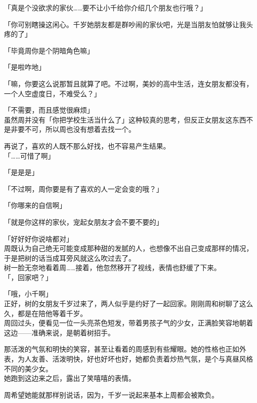「真是个没欲求的家伙……要不让小千给你介绍几个朋友也行哦？」

「你可别瞎操这闲心。千岁她朋友都是群吵闹的家伙吧，光是当朋友怕就够让我头疼的了」

「毕竟周你是个阴暗角色嘛」

「是啦咋地」

「嘛，你要这么说那暂且就算了吧。不过啊，美妙的高中生活，连女朋友都没有，一个人空虚度日，不难受么？」

「不需要，而且感觉很麻烦」\\

虽然周并没有「你把学校生活当什么了」这种较真的思考，但反正女朋友这东西不是非要不可，所以周也没有想着去找一个。

再说了，喜欢的人既不那么好找，也不容易产生结果。\\

「……可惜了啊」

「是是是」

「不过啊，周你要是有了喜欢的人一定会变的哦？」

「你哪来的自信啊」

「就是你这样的家伙，宠起女朋友才会不要不要的」

「好好好你说啥都对」\\

周既认为自己绝无可能变成那种甜的发腻的人，也想像不出自己变成那样的情况，于是把树的话当成耳旁风就这么吹过去了。\\

树一脸无奈地看着周……接着，他忽然移开了视线，表情也舒缓了下来。\\

「，回家吧？」

「哦，小千啊」\\

正好，树的女朋友千岁过来了，两人似乎是约好了一起回家。刚刚周和树聊了这么久，都是在陪他等着千岁。\\

周回过头，便看见一位一头亮茶色短发，带着男孩子气的少女，正满脸笑容地朝着这边——准确来说，是朝着树招手。

那活泼的气氛和明快的笑容，甚至让看着的周感到有些耀眼。她的性格也正如外表，为人友善、活泼明快，好也好坏也好，她都负责着炒热气氛，是个与真昼风格不同的美少女。\\

她跑到这边来之后，露出了笑嘻嘻的表情。

周希望她能就那样别说话，因为，千岁一说起来基本上周都会被欺负。\\

